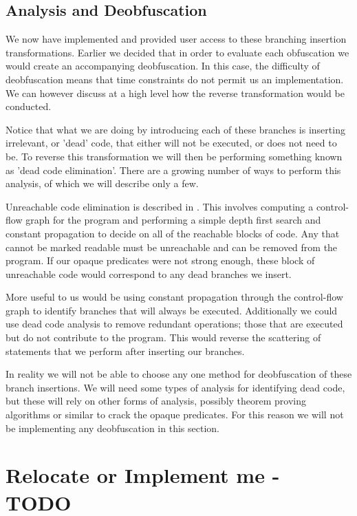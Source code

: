 \documentclass[twoside,a4paper]{report}
\begin{document}
\subsection{Analysis and Deobfuscation}

We now have implemented and provided user access to these branching insertion transformations. Earlier we decided that in order to evaluate each obfuscation
we would create an accompanying deobfuscation. In this case, the difficulty of deobfuscation means that time constraints do not permit us an implementation.
We can however discuss at a high level how the reverse transformation would be conducted.

Notice that what we are doing by introducing each of these branches is inserting irrelevant, or 'dead' code, that either will not be executed, or does not
need to be. To reverse this transformation we will then be performing something known as 'dead code elimination'. There are a growing number of ways to perform
this analysis, of which we will describe only a few.

Unreachable code elimination is described in \cite{codecompact}. This involves computing a control-flow graph for the program and performing a simple depth
first search and constant propagation to decide on all of the reachable blocks of code. Any that cannot be marked readable must be unreachable and can be removed
from the program. If our opaque predicates were not strong enough, these block of unreachable code would correspond to any dead branches we insert.

More useful to us would be using constant propagation through the control-flow graph to identify branches that will always be executed. Additionally we could use
dead code analysis to remove redundant operations; those that are executed but do not contribute to the program. This would reverse the scattering of statements
that we perform after inserting our branches.

In reality we will not be able to choose any one method for deobfuscation of these branch insertions. We will need some types of analysis for identifying dead
code, but these will rely on other forms of analysis, possibly theorem proving algorithms or similar to crack the opaque predicates. For this reason we will not
be implementing any deobfuscation in this section.

\section{Relocate or Implement me - TODO}
\end{document}
